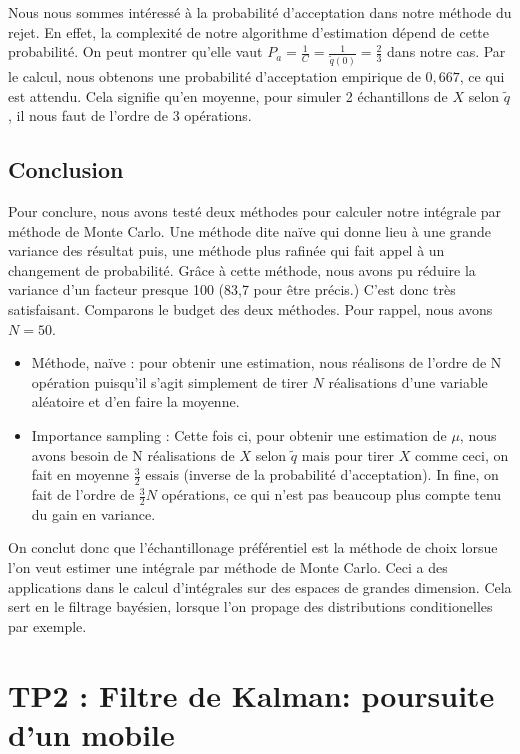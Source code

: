 \documentclass{article}
\begin{document}
Nous nous sommes intéressé à la probabilité d'acceptation dans notre méthode du rejet. En effet, la complexité de notre algorithme d'estimation dépend de cette probabilité.
On peut montrer qu'elle vaut
$P_{a}=\frac{1}{C}=\frac{1}{\tilde{q}(0)}= \frac{2}{3}$ dans notre cas. Par le calcul, nous obtenons une probabilité d'acceptation empirique de $0,667$, ce qui est attendu. Cela signifie qu'en moyenne, pour simuler 2 échantillons de $X$ selon
$\tilde{q}$, il nous faut de l'ordre de 3 opérations. 





\subsection{Conclusion}


Pour conclure, nous avons testé deux méthodes pour calculer notre intégrale par méthode de Monte Carlo. Une méthode dite naïve
qui donne lieu à une grande variance des résultat puis, une méthode plus rafinée qui fait
appel à un changement de probabilité. Grâce à cette méthode, nous avons pu réduire la variance d'un facteur presque 100 (83,7 pour être précis.) C'est donc très satisfaisant. Comparons le budget des deux méthodes. Pour rappel, nous avons
$N=50$. 
\begin{itemize}
   \item Méthode, naïve : pour obtenir une estimation, nous réalisons de l'ordre de N opération puisqu'il s'agit simplement de tirer $N$ réalisations d'une variable aléatoire et d'en faire la moyenne.
   \item Importance sampling : Cette fois ci, pour obtenir une estimation de $\mu$, nous avons besoin de N réalisations de $X$ selon $\tilde{q}$ mais pour tirer $X$ comme ceci, on fait en moyenne $\frac{3}{2}$ essais (inverse de la probabilité d'acceptation). In fine, on fait de l'ordre de $\frac{3}{2}N$ opérations, ce qui n'est pas beaucoup plus compte tenu du gain en variance. 
\end{itemize}

On conclut donc que l'échantillonage préférentiel est la méthode de 
choix lorsue l'on veut estimer une intégrale par méthode de Monte Carlo.
Ceci a des applications dans le calcul d'intégrales sur des espaces de grandes dimension. Cela sert en le filtrage bayésien, 
lorsque l'on propage des distributions conditionelles par exemple.

\newpage
\section{TP2 : Filtre de Kalman: poursuite d'un mobile}
\end{document}
